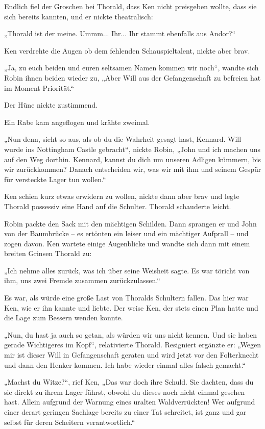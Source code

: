 Endlich fiel der Groschen bei Thorald, dass Ken nicht preisgeben wollte, dass sie sich bereits kannten, und er nickte theatralisch:

„Thorald ist der meine. Ummm... Ihr... Ihr stammt ebenfalls aus Andor?“

Ken verdrehte die Augen ob dem fehlenden Schauspieltalent, nickte aber brav.

„Ja, zu euch beiden und euren seltsamen Namen kommen wir noch“, wandte sich Robin ihnen beiden wieder zu, „Aber Will aus der Gefangenschaft zu befreien hat im Moment Priorität.“

Der Hüne nickte zustimmend.

Ein Rabe kam angeflogen und krähte zweimal.

„Nun denn, sieht so aus, als ob du die Wahrheit gesagt hast, Kennard. Will wurde ins Nottingham Castle gebracht“, nickte Robin, „John und ich machen uns auf den Weg dorthin. Kennard, kannst du dich um unseren Adligen kümmern, bis wir zurückkommen? Danach entscheiden wir, was wir mit ihm und seinem Gespür für versteckte Lager tun wollen.“

Ken schien kurz etwas erwidern zu wollen, nickte dann aber brav und legte Thorald possessiv eine Hand auf die Schulter. Thorald schauderte leicht.

Robin packte den Sack mit den mächtigen Schilden. Dann sprangen er und John von der Baumbrücke – es ertönten ein leiser und ein mächtiger Aufprall – und zogen davon. Ken wartete einige Augenblicke und wandte sich dann mit einem breiten Grinsen Thorald zu:

„Ich nehme alles zurück, was ich über seine Weisheit sagte. Es war töricht von ihm, uns zwei Fremde zusammen zurückzulassen.“

Es war, als würde eine große Last von Thoralds Schultern fallen. Das hier war Ken, wie er ihn kannte und liebte. Der weise Ken, der stets einen Plan hatte und die Lage zum Bessern wenden konnte.

„Nun, du hast ja auch so getan, als würden wir uns nicht kennen. Und sie haben gerade Wichtigeres im Kopf“, relativierte Thorald. Resigniert ergänzte er: „Wegen mir ist dieser Will in Gefangenschaft geraten und wird jetzt vor den Folterknecht und dann den Henker kommen. Ich habe wieder einmal alles falsch gemacht.“

„Machst du Witze?“, rief Ken, „Das war doch ihre Schuld. Sie dachten, dass du sie direkt zu ihrem Lager führst, obwohl du dieses noch nicht einmal gesehen hast. Allein aufgrund der Warnung eines uralten Waldverrückten! Wer aufgrund einer derart geringen Sachlage bereits zu einer Tat schreitet, ist ganz und gar selbst für deren Scheitern verantwortlich.“

